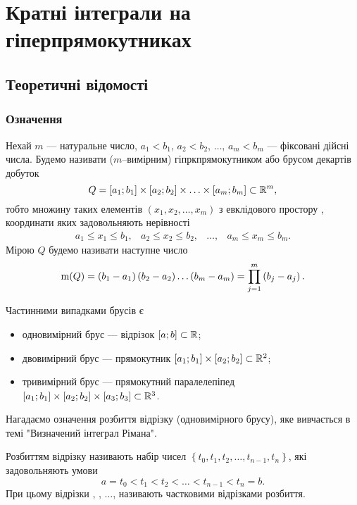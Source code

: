 \part{Кратні інтеграли на гіперпрямокутниках}\label{part:boxes}
\chapter{Теоретичні відомості}
\section{Означення}
\begin{definition}[Гіперпрямокутник]\label{def:box}
Нехай $m$ --- натуральне число, ${a_1<b_1}$, ${a_2 < b_2}$, $\ldots$, ${a_m < b_m}$ --- фіксовані дійсні числа. Будемо називати ($m$--вимірним) гіпркпрямокутником або брусом декартів добуток
\[
Q = \left[a_1;b_1\right]\times\left[a_2;b_2\right]\times\ldots\times\left[a_m;b_m\right] \subset \mathbb{R}^{m},
\]
тобто множину таких елементів ${\left(x_1, x_2, \ldots, x_m\right)}$ з евклідового простору , координати яких задовольняють нерівності
\[
\begin{array}{cccc}
a_1\leq x_1\leq b_1,&
a_2\leq x_2\leq b_2,&
\ldots,&
a_m\leq x_m\leq b_m.
\end{array}
\]
Мірою $Q$ будемо називати наступне число
\[
\mathrm{m}(Q) = \left(b_1-a_1\right)\left(b_2 - a_2\right)\ldots\left(b_m-a_m\right) = \prod\limits_{j=1}^{m}\left(b_j - a_j\right).
\]
\end{definition}
\begin{example}
Частинними випадками брусів є
\begin{itemize}
\item одновимірний брус --- відрізок ${\left[a;b\right]\subset\mathbb{R}}$;
\item двовимірний брус --- прямокутник ${\left[a_1;b_1\right]\times\left[a_2;b_2\right]\subset\mathbb{R}^{2}}$;
\item тривимірний брус --- прямокутний паралелепіпед  ${\left[a_1;b_1\right]\times\left[a_2;b_2\right]\times\left[a_3;b_3\right]\subset\mathbb{R}^{3}}$.
\end{itemize}
\end{example}
Нагадаємо означення розбиття відрізку (одновимірного брусу), яке вивчається в темі "Визначений інтеграл Рімана".
\begin{definition}
Розбиттям відрізку  називають набір чисел ${\left\{t_0, t_1, t_2, \ldots, t_{n-1}, t_{n}\right\}}$, які задовольняють умови
\[
a = t_0 < t_1 < t_2 < \ldots  < t_{n-1} < t_{n} = b.
\]
При цьому відрізки , , ${\ldots}$,  називають частковими відрізками розбиття.

\end{definition}

